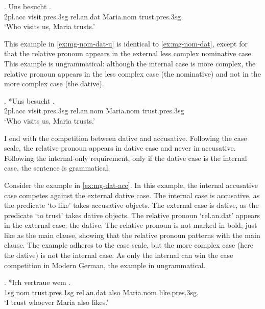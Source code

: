 \exg. Uns besucht   .\\
2\ac{pl}.\ac{acc} visit.\ac{pres}.3\ac{sg}\scsub{[nom]} \ac{rel}.\ac{an}.\ac{dat} Maria.\ac{nom} trust.\ac{pres}.3\ac{sg}\scsub{[dat]}\\
`Who visits us, Maria trusts.' \label{ex:mg-nom-dat}

This example in \ref{ex:mg-nom-dat-u} is identical to \ref{ex:mg-nom-dat}, except for that the relative pronoun appears in the external less complex nominative case. This example is ungrammatical: although the internal case is more complex, the relative pronoun appears in the less complex case (the nominative) and not in the more complex case (the dative).

\exg. *Uns besucht   .\\
2\ac{pl}.\ac{acc} visit.\ac{pres}.3\ac{sg}\scsub{[nom]} \ac{rel}.\ac{an}.\ac{nom} Maria.\ac{nom} trust.\ac{pres}.3\ac{sg}\scsub{[dat]}\\
`Who visits us, Maria trusts.' \label{ex:mg-nom-dat-u}

I end with the competition between dative and accusative. Following the case scale, the relative pronoun appears in dative case and never in accusative. Following the internal-only requirement, only if the dative case is the internal case, the sentence is grammatical.

Consider the example in \ref{ex:mg-dat-acc}. In this example, the internal accusative case competes against the external dative case.
The internal case is accusative, as the predicate  `to like' takes accusative objects.
The external case is dative, as the predicate  `to trust' takes dative objects.
The relative pronoun  `\ac{rel}.\ac{an}.\ac{dat}' appears in the external case: the dative. The relative pronoun is not marked in bold, just like as the main clause, showing that the relative pronoun patterns with the main clause.
The example adheres to the case scale, but the more complex case (here the dative) is not the internal case. As only the internal can win the case competition in Modern German, the example in ungrammatical.

\exg. *Ich vertraue wem   . \\
1\ac{sg}.\ac{nom} trust.\ac{pres}.1\ac{sg}\scsub{[dat]} \ac{rel}.\ac{an}.\ac{dat} also Maria.\ac{nom} like.\ac{pres}.3\ac{sg}\scsub{[acc]}.\\
`I trust whoever Maria also likes.' \label{ex:mg-dat-acc}


